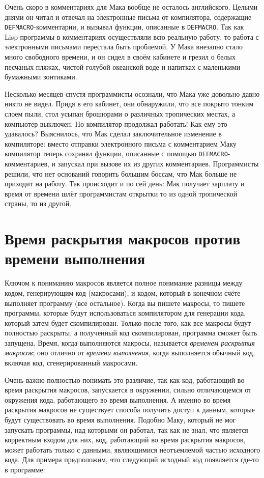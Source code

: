 Очень скоро в комментариях для Мака вообще не осталось английского. Целыми днями он читал
и отвечал на электронные письма от компилятора, содержащие
\lstinline{DEFMACRO}-комментарии, и вызывал функции, описанные в \lstinline{DEFMACRO}. Так
как Lisp-программы в комментариях осуществляли всю реальную работу, то работа с
элект\-рон\-ны\-ми письмами перестала быть проблемой. У Мака внезапно стало много свободного
времени, и он сидел в своём кабинете и грезил о белых песчаных пляжах, чистой голубой
океанской воде и напитках с маленькими бумажными зонтиками.

Несколько месяцев спустя программисты осознали, что Мака уже довольно давно никто не
видел. Придя в его кабинет, они обнаружили, что все покрыто тонким слоем пыли, стол усыпан
брошюрами о различных тропических местах, а компьютер выключен. Но компилятор продолжал
работать! Как ему это удавалось? Выяснилось, что Мак сделал заключительное изменение в
компиляторе: вместо отправки электронного письма с комментарием Маку компилятор теперь
сохранял функции, описанные с помощью \lstinline{DEFMACRO}-комментариев, и запускал при
вызове их из других комментариев. Программисты решили, что нет оснований говорить большим
боссам, что Мак больше не приходит на работу. Так происходит и по сей день: Мак получает
зарплату и время от времени шлёт программистам открытки то из одной тропической страны, то
из другой.

\section{Время раскрытия макросов против времени \mbox{выполнения}}

Ключом к пониманию макросов является полное понимание разницы между кодом, генерирующим
код (макросами), и кодом, который в конечном счёте выполняет программу (все
остальное). Когда вы пишете макросы, то пишете программы, которые будут использоваться
компилятором для генерации кода, который затем будет скомпилирован. Только после того, как
все макросы будут полностью раскрыты, а полученный код скомпилирован, программа сможет
быть запущена. Время, когда выполняются макросы, называется \textit{временем раскрытия
  макросов}; оно отлично от \textit{времени выполнения}, когда выполняется обычный код,
включая код, сгенерированный макросами.

Очень важно полностью понимать это различие, так как код, работающий во время раскрытия
макросов, запускается в окружении, сильно отличающемся от окружения кода, работающего во
время выполнения. А именно во время раскрытия макросов не существует способа получить
доступ к данным, которые будут существовать во время выполнения. Подобно Маку, который не
мог запускать программы, над которыми он работал, так как не знал, что является корректным
входом для них, код, работающий во время раскрытия макросов, может работать только с
данными, являющимися неотъемлемой частью исходного кода. Для примера предположим, что
следующий исходный код появляется где-то в программе:


